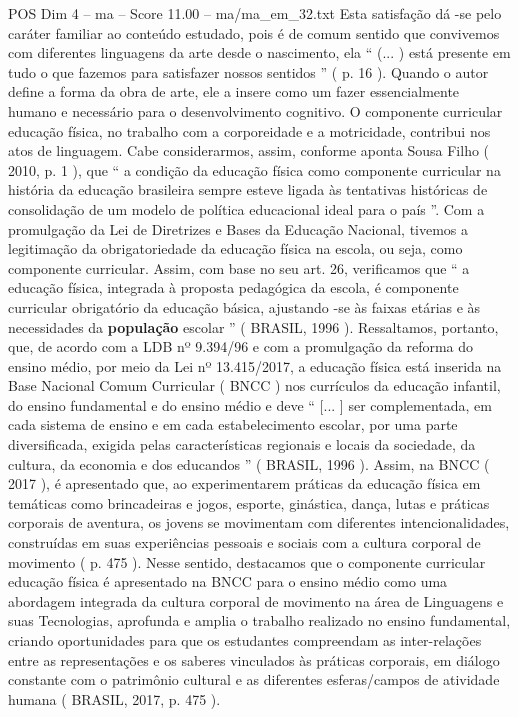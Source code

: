 \begin{textsample}{POS Dim 4 – ma – Score 11.00 – ma/ma\_em\_32.txt}
Esta satisfação dá -se pelo caráter familiar ao conteúdo estudado, pois é de comum sentido que convivemos com diferentes linguagens da arte desde o nascimento, ela “ (... ) está presente em tudo o que fazemos para satisfazer nossos sentidos ” ( p. 16 ).
Quando o autor define a forma da obra de arte, ele a insere como um fazer essencialmente humano e necessário para o desenvolvimento cognitivo.
O componente curricular educação física, no trabalho com a corporeidade e a motricidade, contribui nos atos de linguagem.
Cabe considerarmos, assim, conforme aponta Sousa Filho ( 2010, p. 1 ), que “ a condição da educação física como componente curricular na história da educação brasileira sempre esteve ligada às tentativas históricas de consolidação de um modelo de política educacional ideal para o país ”.
Com a promulgação da Lei de Diretrizes e Bases da Educação Nacional, tivemos a legitimação da obrigatoriedade da educação física na escola, ou seja, como componente curricular.
Assim, com base no seu art. 26, verificamos que “ a educação física, integrada à proposta pedagógica da escola, é componente curricular obrigatório da educação básica, ajustando -se às faixas etárias e às necessidades da \textbf{população} escolar ” ( BRASIL, 1996 ).
Ressaltamos, portanto, que, de acordo com a LDB nº 9.394/96 e com a promulgação da reforma do ensino médio, por meio da Lei nº 13.415/2017, a educação física está inserida na Base Nacional Comum Curricular ( BNCC ) nos currículos da educação infantil, do ensino fundamental e do ensino médio e deve “ [... ] ser complementada, em cada sistema de ensino e em cada estabelecimento escolar, por uma parte diversificada, exigida pelas características regionais e locais da sociedade, da cultura, da economia e dos educandos ” ( BRASIL, 1996 ).
Assim, na BNCC ( 2017 ), é apresentado que, ao experimentarem práticas da educação física em temáticas como brincadeiras e jogos, esporte, ginástica, dança, lutas e práticas corporais de aventura, os jovens se movimentam com diferentes intencionalidades, construídas em suas experiências pessoais e sociais com a cultura corporal de movimento ( p. 475 ).
Nesse sentido, destacamos que o componente curricular educação física é apresentado na BNCC para o ensino médio como uma abordagem integrada da cultura corporal de movimento na área de Linguagens e suas Tecnologias, aprofunda e amplia o trabalho realizado no ensino fundamental, criando oportunidades para que os estudantes compreendam as inter-relações entre as representações e os saberes vinculados às práticas corporais, em diálogo constante com o patrimônio cultural e as diferentes esferas/campos de atividade humana ( BRASIL, 2017, p. 475 ).

\end{textsample}
